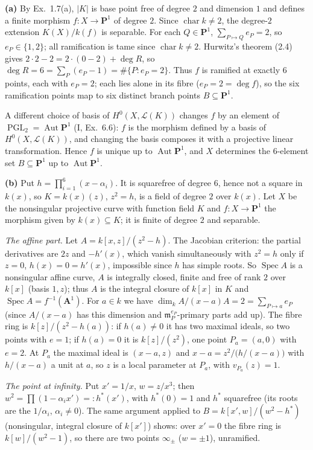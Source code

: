 \documentclass[11pt]{article}
\begin{document}
\pf
\textbf{(a)} By Ex.~1.7(a), $|K|$ is base point free of degree $2$ and dimension $1$ and defines a finite morphism $f:X\to\mathbf P^1$ of degree $2$. Since $\operatorname{char}k\ne2$, the degree-$2$ extension $K(X)/k(f)$ is separable. For each $Q\in\mathbf P^1$, $\sum_{P\mapsto Q}e_P=2$, so $e_P\in\{1,2\}$; all ramification is tame since $\operatorname{char}k\ne2$. Hurwitz's theorem (2.4) gives $2\cdot2-2=2\cdot(0-2)+\deg R$, so $\deg R=6=\sum_P(e_P-1)=\#\{P:e_P=2\}$. Thus $f$ is ramified at exactly $6$ points, each with $e_P=2$; each lies alone in its fibre ($e_P=2=\deg f$), so the six ramification points map to six distinct branch points $B\subseteq\mathbf P^1$.

A different choice of basis of $H^0(X,\mathcal L(K))$ changes $f$ by an element of $\operatorname{PGL}_2=\operatorname{Aut}\mathbf P^1$ (I, Ex.~6.6): $f$ is the morphism defined by a basis of $H^0(X,\mathcal L(K))$, and changing the basis composes it with a projective linear transformation. Hence $f$ is unique up to $\operatorname{Aut}\mathbf P^1$, and $X$ determines the $6$-element set $B\subseteq\mathbf P^1$ up to $\operatorname{Aut}\mathbf P^1$.

\textbf{(b)} Put $h=\prod_{i=1}^6(x-\alpha_i)$. It is squarefree of degree $6$, hence not a square in $k(x)$, so $K=k(x)(z)$, $z^2=h$, is a field of degree $2$ over $k(x)$. Let $X$ be the nonsingular projective curve with function field $K$ and $f:X\to\mathbf P^1$ the morphism given by $k(x)\subseteq K$; it is finite of degree $2$ and separable.

\emph{The affine part.} Let $A=k[x,z]/(z^2-h)$. The Jacobian criterion: the partial derivatives are $2z$ and $-h'(x)$, which vanish simultaneously with $z^2=h$ only if $z=0$, $h(x)=0=h'(x)$, impossible since $h$ has simple roots. So $\operatorname{Spec}A$ is a nonsingular affine curve, $A$ is integrally closed, finite and free of rank $2$ over $k[x]$ (basis $1,z$); thus $A$ is the integral closure of $k[x]$ in $K$ and $\operatorname{Spec}A=f^{-1}(\mathbf A^1)$. For $a\in k$ we have $\dim_kA/(x-a)A=2=\sum_{P\mapsto a}e_P$ (since $A/(x-a)$ has this dimension and $\mathfrak m_P^{e_P}$-primary parts add up). The fibre ring is $k[z]/(z^2-h(a))$: if $h(a)\ne0$ it has two maximal ideals, so two points with $e=1$; if $h(a)=0$ it is $k[z]/(z^2)$, one point $P_a=(a,0)$ with $e=2$. At $P_a$ the maximal ideal is $(x-a,z)$ and $x-a=z^2\big/\big(h/(x-a)\big)$ with $h/(x-a)$ a unit at $a$, so $z$ is a local parameter at $P_a$, with $v_{P_a}(z)=1$.

\emph{The point at infinity.} Put $x'=1/x$, $w=z/x^3$; then $w^2=\prod(1-\alpha_ix')=:h^*(x')$, with $h^*(0)=1$ and $h^*$ squarefree (its roots are the $1/\alpha_i$, $\alpha_i\ne0$). The same argument applied to $B=k[x',w]/(w^2-h^*)$ (nonsingular, integral closure of $k[x']$) shows: over $x'=0$ the fibre ring is $k[w]/(w^2-1)$, so there are two points $\infty_\pm$ ($w=\pm1$), unramified.
\end{document}
